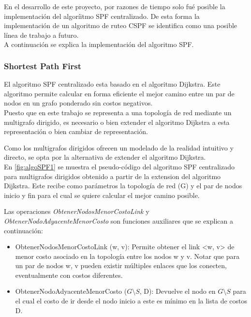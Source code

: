 En el desarrollo de este proyecto, por razones de tiempo solo fu\'e posible la implementaci\'on del algor\'iitmo SPF centralizado. De esta forma la implementaci\'on de un algoritmo de ruteo CSPF se identifica como una posible l\'inea de trabajo a futuro.\\

A continuaci\'on se explica la implementaci\'on del algoritmo SPF. 

\subsubsection{Shortest Path First}
El algoritmo SPF centralizado esta basado en el algoritmo Dijkstra. Este algoritmo permite calcular en forma eficiente el mejor camino entre un par de nodos en un grafo ponderado sin costos negativos.\\

Puesto que en este trabajo se representa a una topolog\'ia de red mediante un multigrafo dirigido, es necesario o bien extender el algoritmo Dijkstra a esta representaci\'on o bien cambiar de representaci\'on. 

Como los multigrafos dirigidos ofrecen un modelado de la realidad intuitivo y directo, se opta por la alternativa de extender el algoritmo Dijkstra.\\

En \ref{fig:algoSPF1} se muestra el pseudo-c\'odigo del algoritmo SPF centralizado para multigrafos dirigidos obtenido a partir de la extension del algoritmo Dijkstra. Este recibe como par\'ametros la topolog\'ia de red (G) y el par de nodos inicio y fin para el cual se quiere calcular el mejor camino posible. 

Las operaciones \textit{ObtenerNodosMenorCostoLink} y \textit{ObtenerNodoAdyacenteMenorCosto} son funciones auxiliares que se explican a continuación:

\begin{itemize}
\item ObtenerNodosMenorCostoLink (w, v): Permite obtener el link <w, v> de menor costo asociado en la topolog\'ia entre los nodos w y v. Notar que para un par de nodos w, v pueden existir m\'ultiples enlaces que los conecten, eventualmente con costos diferentes. 

\item ObtenerNodoAdyacenteMenorCosto ($G\setminus S$, D): Devuelve el nodo en $G\setminus S$ para el cual el costo de ir desde el nodo inicio a este es m\'inimo en la lista de costos D.
\end{itemize}

